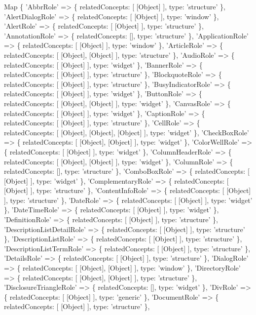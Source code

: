 \begin{DoxyCode}
Map \{
  'AbbrRole' => \{ relatedConcepts: [ [Object] ], type: 'structure' \},
  'AlertDialogRole' => \{ relatedConcepts: [ [Object] ], type: 'window' \},
  'AlertRole' => \{ relatedConcepts: [ [Object] ], type: 'structure' \},
  'AnnotationRole' => \{ relatedConcepts: [], type: 'structure' \},
  'ApplicationRole' => \{ relatedConcepts: [ [Object] ], type: 'window' \},
  'ArticleRole' => \{ relatedConcepts: [ [Object], [Object] ], type: 'structure' \},
  'AudioRole' => \{ relatedConcepts: [ [Object] ], type: 'widget' \},
  'BannerRole' => \{ relatedConcepts: [ [Object] ], type: 'structure' \},
  'BlockquoteRole' => \{ relatedConcepts: [ [Object] ], type: 'structure' \},
  'BusyIndicatorRole' => \{ relatedConcepts: [ [Object] ], type: 'widget' \},
  'ButtonRole' => \{ relatedConcepts: [ [Object], [Object] ], type: 'widget' \},
  'CanvasRole' => \{ relatedConcepts: [ [Object] ], type: 'widget' \},
  'CaptionRole' => \{ relatedConcepts: [ [Object] ], type: 'structure' \},
  'CellRole' => \{ relatedConcepts: [ [Object], [Object], [Object] ], type: 'widget' \},
  'CheckBoxRole' => \{ relatedConcepts: [ [Object], [Object] ], type: 'widget' \},
  'ColorWellRole' => \{ relatedConcepts: [ [Object] ], type: 'widget' \},
  'ColumnHeaderRole' => \{ relatedConcepts: [ [Object], [Object] ], type: 'widget' \},
  'ColumnRole' => \{ relatedConcepts: [], type: 'structure' \},
  'ComboBoxRole' => \{ relatedConcepts: [ [Object] ], type: 'widget' \},
  'ComplementaryRole' => \{ relatedConcepts: [ [Object] ], type: 'structure' \},
  'ContentInfoRole' => \{ relatedConcepts: [ [Object] ], type: 'structure' \},
  'DateRole' => \{ relatedConcepts: [ [Object] ], type: 'widget' \},
  'DateTimeRole' => \{ relatedConcepts: [ [Object] ], type: 'widget' \},
  'DefinitionRole' => \{ relatedConcepts: [ [Object] ], type: 'structure' \},
  'DescriptionListDetailRole' => \{ relatedConcepts: [ [Object] ], type: 'structure' \},
  'DescriptionListRole' => \{ relatedConcepts: [ [Object] ], type: 'structure' \},
  'DescriptionListTermRole' => \{ relatedConcepts: [ [Object] ], type: 'structure' \},
  'DetailsRole' => \{ relatedConcepts: [ [Object] ], type: 'structure' \},
  'DialogRole' => \{ relatedConcepts: [ [Object], [Object] ], type: 'window' \},
  'DirectoryRole' => \{ relatedConcepts: [ [Object], [Object] ], type: 'structure' \},
  'DisclosureTriangleRole' => \{ relatedConcepts: [], type: 'widget' \},
  'DivRole' => \{ relatedConcepts: [ [Object] ], type: 'generic' \},
  'DocumentRole' => \{ relatedConcepts: [ [Object] ], type: 'structure' \},

\end{DoxyCode}
